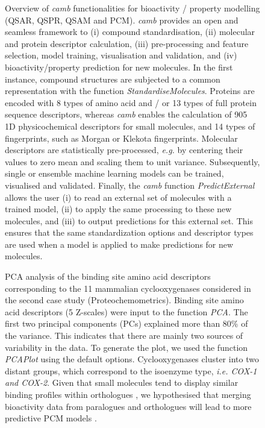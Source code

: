 \documentclass[twoside,a4wide,10pt]{article}
\begin{document}
\begin{figure}[htb!]
\begin{center}
\end{center}
\caption{Overview of {\it camb} functionalities for bioactivity / property modelling (QSAR, QSPR, QSAM and PCM). 
{\it camb} provides an open and seamless framework to 
(i) compound standardisation, 
(ii) molecular and protein descriptor calculation, 
(iii) pre-processing and feature selection, model training, visualisation and validation, 
and (iv) bioactivity/property prediction for new molecules.
In the first instance, compound structures are subjected to a common representation with the function {\it StandardiseMolecules}.
Proteins are encoded with 8 types of amino acid and / or 13 types of full protein sequence descriptors,
whereas {\it camb} enables the calculation of 905 1D physicochemical descriptors for small molecules, 
and 14 types of fingerprints, such as Morgan or Klekota fingerprints.
Molecular descriptors are statistically pre-processed, {\it e.g.} by centering their values to zero mean and scaling them to unit variance.
Subsequently, single or ensemble machine learning models can be trained, visualised and validated.
Finally, the {\it camb} function {\it PredictExternal} allows the user (i) to read an external set of molecules with a trained model,
(ii) to apply the same processing to these new molecules, and (iii) to output predictions for this external set.
This ensures that the same standardization options and descriptor types are used when a model is applied to make predictions for new molecules.
}
\label{}
\end{figure}


\begin{figure}[htb!]
\begin{center}
\end{center}
\caption{PCA analysis of the binding site amino acid descriptors corresponding to the 11 mammalian cyclooxygenases
considered in the second case study (Proteochemometrics).
Binding site amino acid descriptors (5 Z-scales) were input to the function {\it PCA}.
The first two principal components (PCs) explained more than 80\% of the variance.
This indicates that there are mainly two sources of variability in the data.
To generate the plot, we used the function {\it PCAPlot} using the default options.
Cyclooxygenases cluster into two distant groups,
which correspond to the isoenzyme type, {\it i.e. COX-1 and COX-2}.
Given that small molecules tend to display similar binding profiles within orthologues \citep{krueger},
we hypothesised that merging bioactivity data from paralogues and orthologues will lead to more predictive PCM models \citep{cortesCOX}.
}
\label{}
\end{figure}
\end{document}

